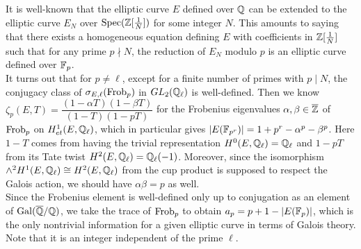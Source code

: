 It is well-known that the elliptic curve $E$ defined over $\mathbb{Q}$ can be extended to the elliptic curve $E_N$ over $\mathrm{Spec}(\mathbb{Z}[\frac{1}{N} ])$ for some integer $N$. This amounts to saying that there exists a homogeneous equation defining $E$ with coefficients in $\mathbb{Z}[\frac{1}{N}]$ such that for any prime $p \nmid N$, the reduction of $E_N$ modulo $p$ is an elliptic curve defined over $\mathbb{F}_p$.\\

It turns out that for $p\neq \ell$, except for a finite number of primes with $p \mid N$, the conjugacy class of $\sigma_{E,\ell}(\mathrm{Frob}_p)$ in $GL_2(\mathbb{Q}_\ell)$ is well-defined. Then we know $\zeta_p(E,T ) = \dfrac{(1-\alpha T) (1-\beta T) }{(1-T) (1-pT) } $ for the Frobenius eigenvalues $\alpha,\beta \in \overline{\mathbb{Z}}$ of $\mathrm{Frob}_p$ on $H^1_{et}(E,\mathbb{Q}_\ell )$, which in particular gives $|E(\mathbb{F}_{p^r}) | = 1 +p^r - \alpha^p - \beta^p$. Here $1-T$ comes from having the trivial representation $H^0(E,\mathbb{Q}_\ell)=\mathbb{Q}_\ell$ and $1-pT$ from its Tate twist $H^2(E,\mathbb{Q}_\ell)= \mathbb{Q}_\ell(-1)$. Moreover, since the isomorphism $\wedge^2 H^1(E,\mathbb{Q}_\ell)\cong H^2(E,\mathbb{Q}_\ell)$ from the cup product is supposed to respect the Galois action, we should have $\alpha \beta = p$ as well.\\

Since the Frobenius element is well-defined only up to conjugation as an element of $\mathrm{Gal}(\overline{\mathbb{Q}}/\mathbb{Q} )$, we take the trace of $\mathrm{Frob}_p$ to obtain $a_p = p+1 - | E(\mathbb{F}_p) |$, which is the only nontrivial information for a given elliptic curve in terms of Galois theory. Note that it is an integer independent of the prime $\ell$.
